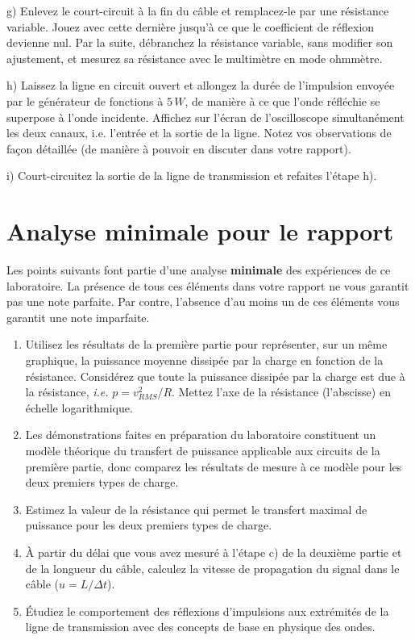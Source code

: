 \documentclass[canadien,12pt,oneside,letterpaper]{article}
\begin{document}
g) Enlevez le court-circuit à la fin du câble et remplacez-le par une résistance variable. Jouez avec cette dernière jusqu'à ce que le coefficient de réflexion devienne nul. Par la suite, débranchez la résistance variable, sans modifier son ajustement, et mesurez sa résistance avec le multimètre en mode ohmmètre.

h) Laissez la ligne en circuit ouvert et allongez la durée de l'impulsion envoyée par le générateur de fonctions à $5\,W$, de manière à ce que l'onde réfléchie se superpose à l'onde incidente. Affichez sur l'écran de l'oscilloscope simultanément les deux canaux, i.e. l'entrée et la sortie de la ligne. Notez vos observations de façon détaillée (de manière à pouvoir en discuter dans votre rapport).

i) Court-circuitez la sortie de la ligne de transmission et refaites l'étape h).


\section{Analyse minimale pour le rapport}

Les points suivants font partie d'une analyse \textbf{minimale} des expériences de ce laboratoire. La présence de tous ces éléments dans votre rapport ne vous garantit pas une note parfaite. Par contre, l'absence d'au moins un de ces éléments vous garantit une note imparfaite.

\begin{enumerate}
    \item Utilisez les résultats de la première partie pour représenter, sur un même graphique, la puissance moyenne dissipée par la charge en fonction de la résistance. Considérez que toute la puissance dissipée par la charge est due à la résistance, \textit{i.e.} $p=v_{RMS}^2/R$. Mettez l'axe de la résistance (l'abscisse) en échelle logarithmique. 
    \item Les démonstrations faites en préparation du laboratoire constituent un modèle théorique du transfert de puissance applicable aux circuits de la première partie, donc comparez les résultats de mesure à ce modèle pour les deux premiers types de charge.
    \item Estimez la valeur de la résistance qui permet le transfert maximal de puissance pour les deux premiers types de charge.
    \item À partir du délai que vous avez mesuré à l'étape c) de la deuxième partie et de la longueur du câble, calculez la vitesse de propagation du signal dans le câble ($u=L/\Delta t$).
    \item Étudiez le comportement des réflexions d'impulsions aux extrémités de la ligne de transmission avec des concepts de base en physique des ondes.
\end{enumerate}
\end{document}
